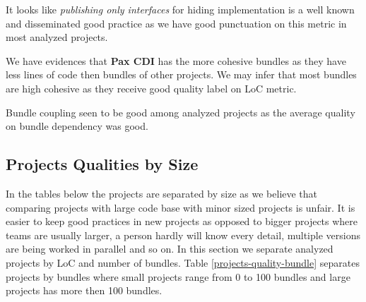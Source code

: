 It looks like \emph{publishing only interfaces} for hiding implementation is a well known and disseminated good practice as we have good punctuation on this metric in most analyzed projects.  

We have evidences that \textbf{Pax CDI} has the more cohesive bundles as they have less lines of code then bundles of other projects. We may infer that most bundles are high cohesive as they receive good quality label on LoC metric.

Bundle coupling seen to be good among analyzed projects as the average quality on bundle dependency was good.

 
\subsection{Projects Qualities by Size}

In the tables below the projects are separated by size as we believe that comparing projects with large code base with minor sized projects is unfair. It is easier to keep good practices in new projects as opposed to bigger projects where teams are usually larger, a person hardly will know every detail, multiple versions are being worked in parallel and so on.  In this section we separate analyzed projects by LoC and number of bundles. Table \ref{projects-quality-bundle} separates projects by bundles where small projects range from 0 to 100 bundles and large projects has more then 100 bundles.


